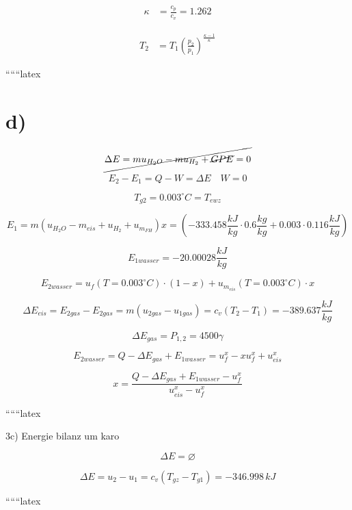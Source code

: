  \\
\begin{align*}
\kappa &= \frac{c_p}{c_v} = 1.262
\end{align*}

\begin{align*}
T_2 &= T_1 \left( \frac{p_2}{p_1} \right)^{\frac{\kappa - 1}{\kappa}}
\end{align*}

``````latex

\section*{d)}

\[
\cancel{\Delta E = m u_{H_2O} - m u_{H_2} + \cancel{GPE} = 0}
\]

\[
E_2 - E_1 = Q - W = \Delta E \quad W = 0
\]

\[
T_{g2} = 0.003^\circ C = T_{ewz}
\]

\[
E_1 = m (u_{H_2O} - m_{eis} + u_{H_2} + u_{m_{FH}}) x = (-333.458 \frac{kJ}{kg} \cdot 0.6 \frac{kg}{kg} + 0.003 \cdot 0.116 \frac{kJ}{kg})
\]

\[
E_{1 wasser} = -20.00028 \frac{kJ}{kg}
\]

\[
E_{2 wasser} = u_f (T = 0.003^\circ C) \cdot (1 - x) + u_{m_{eis}} (T = 0.003^\circ C) \cdot x
\]

\[
\Delta E_{eis} = E_{2 gas} - E_{2 gas} = m (u_{2 gas} - u_{1 gas}) = c_v (T_2 - T_1) = -389.637 \frac{kJ}{kg}
\]

\[
\Delta E_{gas} = P_{1,2} = 4500 \gamma
\]

\[
E_{2 wasser} = Q - \Delta E_{gas} + E_{1 wasser} = u_f^x - x u_f^x + u_{eis}^x
\]

\[
x = \frac{Q - \Delta E_{gas} + E_{1 wasser} - u_f^x}{u_{eis}^x - u_f^x}
\]

``````latex


3c) \quad Energie bilanz um karo

\[
\Delta E = \varnothing
\]

\[
\Delta E = u_2 - u_1 = c_v (T_{gz} - T_{g1}) = -346.998 \, kJ
\]

``````latex


